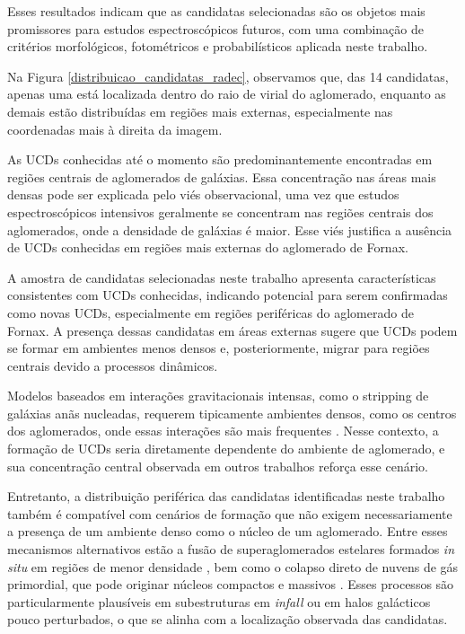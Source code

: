 Esses resultados indicam que as candidatas selecionadas são os objetos mais promissores para estudos espectroscópicos futuros, com uma combinação de critérios morfológicos, fotométricos e probabilísticos aplicada neste trabalho.

Na Figura \ref{distribuicao_candidatas_radec}, observamos que, das 14 candidatas, apenas uma está localizada dentro do raio de virial do aglomerado, enquanto as demais estão distribuídas em regiões mais externas, especialmente nas coordenadas mais à direita da imagem.

As UCDs conhecidas até o momento são predominantemente encontradas em regiões centrais de aglomerados de galáxias. Essa concentração nas áreas mais densas pode ser explicada pelo viés observacional, uma vez que estudos espectroscópicos intensivos geralmente se concentram nas regiões centrais dos aglomerados, onde a densidade de galáxias é maior. Esse viés justifica a ausência de UCDs conhecidas em regiões mais externas do aglomerado de Fornax.

A amostra de candidatas selecionadas neste trabalho apresenta características consistentes com UCDs conhecidas, indicando potencial para serem confirmadas como novas UCDs, especialmente em regiões periféricas do aglomerado de Fornax. A presença dessas candidatas em áreas externas sugere que UCDs podem se formar em ambientes menos densos e, posteriormente, migrar para regiões centrais devido a processos dinâmicos.

Modelos baseados em interações gravitacionais intensas, como o stripping de galáxias anãs nucleadas, requerem tipicamente ambientes densos, como os centros dos aglomerados, onde essas interações são mais frequentes \citep{Bekki_2001,Pfeffer_2016}. Nesse contexto, a formação de UCDs seria diretamente dependente do ambiente de aglomerado, e sua concentração central observada em outros trabalhos reforça esse cenário. 

Entretanto, a distribuição periférica das candidatas identificadas neste trabalho também é compatível com cenários de formação que não exigem necessariamente a presença de um ambiente denso como o núcleo de um aglomerado. Entre esses mecanismos alternativos estão a fusão de superaglomerados estelares formados \textit{in situ} em regiões de menor densidade \citep{Mieske_2011}, bem como o colapso direto de nuvens de gás primordial, que pode originar núcleos compactos e massivos \citep{Drinkwater_2003}. Esses processos são particularmente plausíveis em subestruturas em \textit{infall} ou em halos galácticos pouco perturbados, o que se alinha com a localização observada das candidatas.


